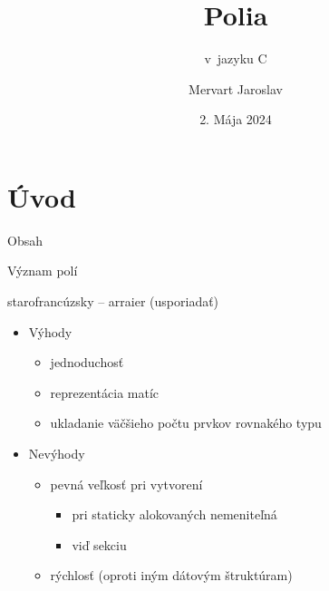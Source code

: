 \documentclass[xcolor=dvipsnames]{beamer}
\title[Polia]{{\Huge Polia}}
\subtitle{v~jazyku C}
\institute[]{Vysoké učení technické v~Brně}
\author[Dátové štruktúry ]{Mervart Jaroslav }
\date{2. Mája 2024}
\begin{document}
{
\begin{frame}[noframenumbering]
    \maketitle
\end{frame}
}
\section{Úvod}
\begin{frame}{Obsah}
    \tableofcontents[sectionstyle=show]
\end{frame}
\begin{frame}{Význam polí }
    \begin{block}{\footnotesize{starofrancúzsky -- arraier (usporiadať)}}
\begin{quote}
     \footnotemark 
\end{quote}
\end{block}
    \begin{itemize}
        \item Výhody
        \begin{itemize}
            \item jednoduchosť
            \item reprezentácia matíc
            \item ukladanie väčšieho počtu prvkov rovnakého typu
        \end{itemize}
        \item Nevýhody
        \begin{itemize}
            \item pevná veľkosť pri vytvorení
            \begin{itemize}
                \item pri staticky alokovaných nemeniteľná
                \item viď sekciu 
            \end{itemize}
            \item rýchlosť (oproti iným dátovým štruktúram)
        \end{itemize}
    \end{itemize}
\end{frame}
\end{document}
